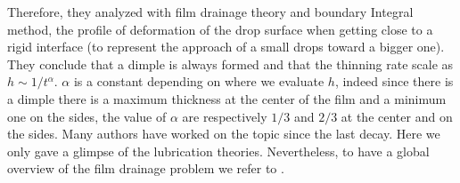 Therefore, they analyzed with film drainage theory and boundary Integral method, the profile of deformation of the drop surface when getting close to a rigid interface (to represent the approach of a small drops toward a bigger one).
They conclude that a dimple is always formed and that the thinning rate scale as $h\sim 1/t^\alpha$.
$\alpha$ is a constant depending on where we evaluate $h$, indeed since there is a dimple there is a maximum thickness at the center of the film and a minimum one on the sides, the value of $\alpha$ are respectively $1/3$ and $2/3$ at the center and on the sides.
Many authors have worked on the topic since the last decay.
Here we only gave a glimpse of the lubrication theories. 
Nevertheless, to have a global overview of the film drainage problem we refer to \citet[Chapter 6]{leal2007advanced}.  

